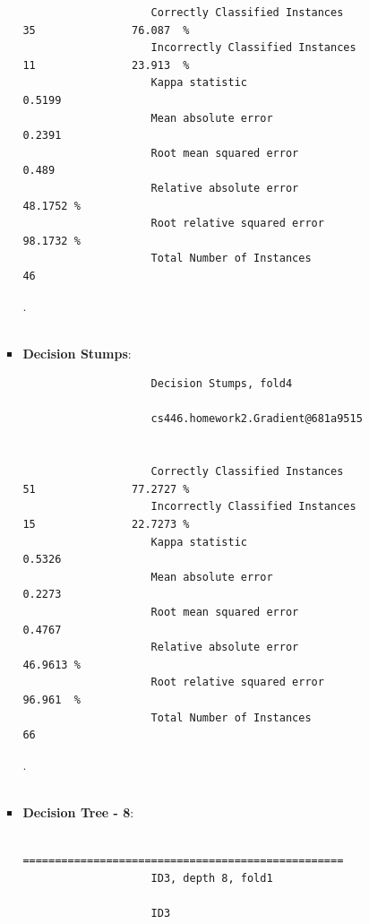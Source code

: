 \begin{enumerate}
\begin{itemize}
\begin{itemize}
\begin{verbatim}
					Correctly Classified Instances          35               76.087  %
					Incorrectly Classified Instances        11               23.913  %
					Kappa statistic                          0.5199
					Mean absolute error                      0.2391
					Root mean squared error                  0.489
					Relative absolute error                 48.1752 %
					Root relative squared error             98.1732 %
					Total Number of Instances               46
					\end{verbatim}
					.\\\\
				\item \textbf{Decision Stumps}: \\
					\begin{verbatim}
					Decision Stumps, fold4

					cs446.homework2.Gradient@681a9515


					Correctly Classified Instances          51               77.2727 %
					Incorrectly Classified Instances        15               22.7273 %
					Kappa statistic                          0.5326
					Mean absolute error                      0.2273
					Root mean squared error                  0.4767
					Relative absolute error                 46.9613 %
					Root relative squared error             96.961  %
					Total Number of Instances               66
					\end{verbatim}
					.\\\\
				\item \textbf{Decision Tree - 8}: \\
					\begin{verbatim}
					==================================================
					ID3, depth 8, fold1

					ID3


\end{verbatim}
\end{itemize}
\end{itemize}
\end{enumerate}
